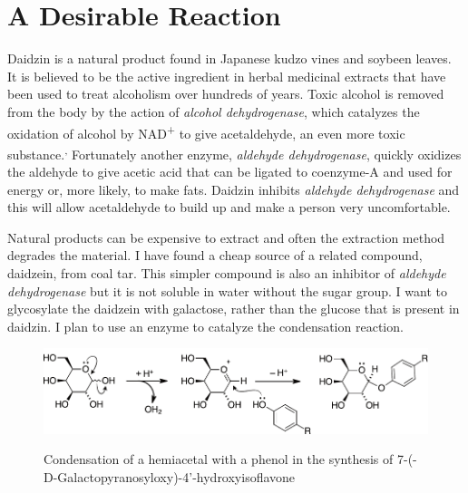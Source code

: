 \documentclass[]{tufte-handout}
\begin{document}
\section{A Desirable Reaction}

Daidzin is a natural product found in Japanese kudzo vines and soybeen leaves. It is believed to be the active ingredient in herbal medicinal extracts that have been used to treat alcoholism over hundreds of years. Toxic alcohol is removed from the body by the action of \emph{alcohol dehydrogenase}, which cata\-lyz\-es the oxidation of alcohol by NAD\textsuperscript{+} to give acetaldehyde, an even more toxic substance.\textsuperscript{,}
 Fortunately another enzyme, \emph{aldehyde de\-hy\-drog\-en\-ase}, quick\-ly oxid\-izes the aldehyde to give acetic acid that can be ligated to coenzyme-A and used for energy or, more likely, to make fats. Daidzin inhibits \emph{aldehyde de\-hy\-drog\-en\-ase} and this will allow acetaldehyde to build up and make a person very uncomfortable. 

Natural products can be expensive to extract and often the extraction method degrades the material. I have found a cheap source of a related compound, daidzein, from coal tar. This simpler compound is also an inhibitor of \emph{aldehyde de\-hy\-drog\-en\-ase} but it is not soluble in water without the sugar group. I want to glycosylate the daidzein with galactose, rather than the glucose that is present in daidzin. I plan to use an enzyme to catalyze the condensation reaction.

\begin{figure}[h!]

  \caption[0mm]{Condensation of a hemiacetal with a phenol in the synthesis of  7-(\textbeta -D-Galactopyranosyloxy)-4'-hydroxyisoflavone} 
  \vspace{2mm}
    \centering
  \includegraphics[scale=0.6]{reaction1.pdf}
  \vspace{5mm}
  \label{fig:fig2}
\end{figure}
\end{document}
